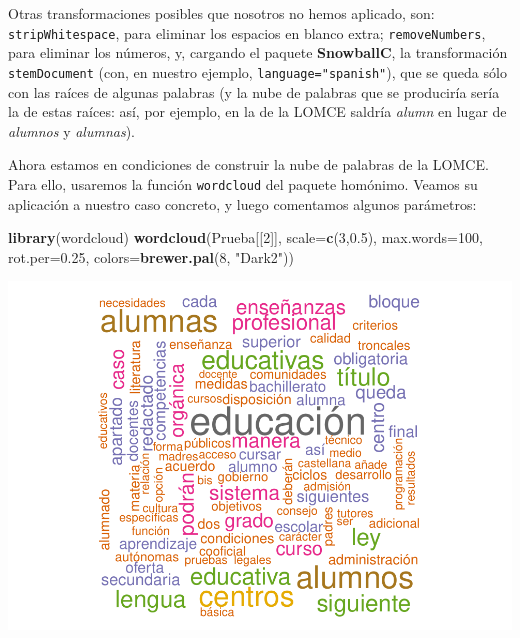 \documentclass[
]{book}
\newenvironment{Shaded}{\begin{snugshade}}{\end{snugshade}}
\newcommand{\DataTypeTok}[1]{\textcolor[rgb]{0.13,0.29,0.53}{#1}}
\newcommand{\DecValTok}[1]{\textcolor[rgb]{0.00,0.00,0.81}{#1}}
\newcommand{\FloatTok}[1]{\textcolor[rgb]{0.00,0.00,0.81}{#1}}
\newcommand{\KeywordTok}[1]{\textcolor[rgb]{0.13,0.29,0.53}{\textbf{#1}}}
\newcommand{\NormalTok}[1]{#1}
\newcommand{\StringTok}[1]{\textcolor[rgb]{0.31,0.60,0.02}{#1}}
\theoremstyle{definition}
\theoremstyle{definition}
\theoremstyle{definition}
\theoremstyle{remark}
\begin{document}
Otras transformaciones posibles que nosotros no hemos aplicado, son: \texttt{stripWhitespace}, para eliminar los espacios en blanco extra; \texttt{removeNumbers}, para eliminar los números, y, cargando el paquete \textbf{SnowballC}, la transformación \texttt{stemDocument} (con, en nuestro ejemplo, \texttt{language="spanish"}), que se queda sólo con las raíces de algunas palabras (y la nube de palabras que se produciría sería la de estas raíces: así, por ejemplo, en la de la LOMCE saldría \emph{alumn} en lugar de \emph{alumnos} y \emph{alumnas}).

Ahora estamos en condiciones de construir la nube de palabras de la LOMCE. Para ello, usaremos la función \texttt{wordcloud} del paquete homónimo. Veamos su aplicación a nuestro caso concreto, y luego comentamos algunos parámetros:

\begin{Shaded}
\begin{Highlighting}[]
\KeywordTok{library}\NormalTok{(wordcloud)}
\KeywordTok{wordcloud}\NormalTok{(Prueba[[}\DecValTok{2}\NormalTok{]],}
                 \DataTypeTok{scale=}\KeywordTok{c}\NormalTok{(}\DecValTok{3}\NormalTok{,}\FloatTok{0.5}\NormalTok{), }\DataTypeTok{max.words=}\DecValTok{100}\NormalTok{,}
                 \DataTypeTok{rot.per=}\FloatTok{0.25}\NormalTok{,}
                 \DataTypeTok{colors=}\KeywordTok{brewer.pal}\NormalTok{(}\DecValTok{8}\NormalTok{, }\StringTok{"Dark2"}\NormalTok{))}
\end{Highlighting}
\end{Shaded}

\begin{center}\includegraphics[width=0.9\linewidth]{14cap13_EDextra_files/figure-latex/unnamed-chunk-10-1} \end{center}
\end{document}
